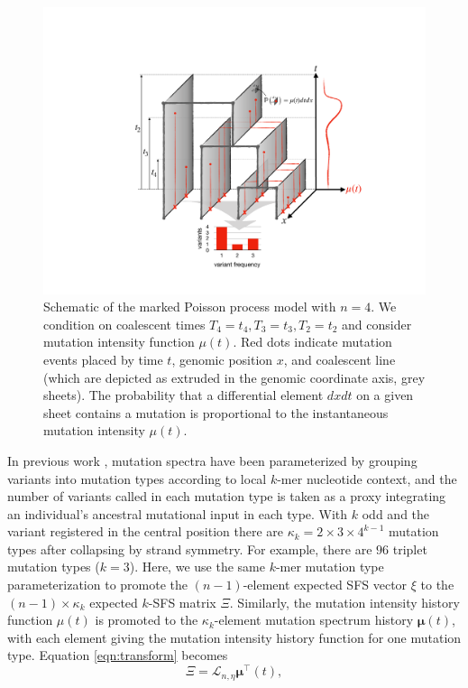\documentclass[11pt]{article}
\begin{document}
\begin{figure}
\centering
\includegraphics[width=\textwidth]{figures/model}
\caption{Schematic of the marked Poisson process model with $n=4$.
We condition on coalescent times $T_4=t_4,T_3=t_3,T_2=t_2$ and consider mutation intensity function $\mu(t)$.
Red dots indicate mutation events placed by time $t$, genomic position $x$, and coalescent line (which are depicted as extruded in the genomic coordinate axis, grey sheets).
The probability that a differential element $dxdt$ on a given sheet contains a mutation is proportional to the instantaneous mutation intensity $\mu(t)$.
}
\label{fig:model}
\end{figure}

In previous work \citep{Kelley, cancer, etc}, mutation spectra have been parameterized by grouping variants into mutation types according to local $k$-mer nucleotide context, and the number of variants called in each mutation type is taken as a proxy integrating an individual's ancestral mutational input in each type.
With $k$ odd and the variant registered in the central position there are $\kappa_k=2\times3\times4^{k-1}$ mutation types after collapsing by strand symmetry.
For example, there are $96$ triplet mutation types ($k=3$).
Here, we use the same $k$-mer mutation type parameterization to promote the $(n-1)$-element expected SFS vector $\xi$ to the $(n-1)\times\kappa_k$ expected $k$-SFS matrix $\Xi$.
Similarly, the mutation intensity history function $\mu(t)$ is promoted to the $\kappa_k$-element mutation spectrum history $\boldsymbol\mu(t)$, with each element giving the mutation intensity history function for one mutation type.
Equation \eqref{eqn:transform} becomes
\begin{equation}
  \label{eqn:transform_matrix}
\Xi = \mathcal{L}_{n,\eta}\boldsymbol\mu^\intercal(t),
\end{equation}
\end{document}
